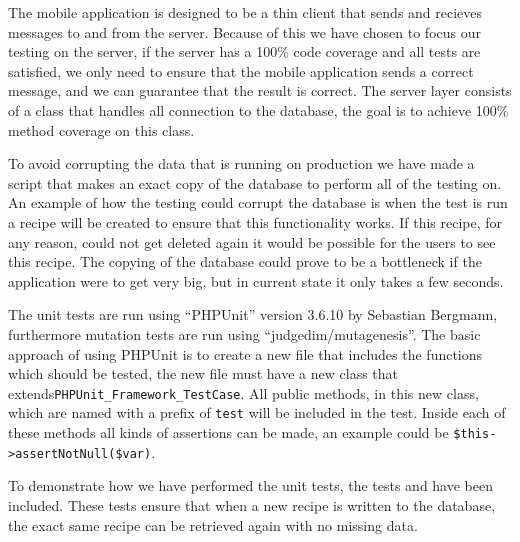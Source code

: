 The mobile application is designed to be a thin client that sends and recieves messages to and from the server. Because of this we have chosen to focus our testing on the server, if the server has a 100\% code coverage and all tests are satisfied, we only need to ensure that the mobile application sends a correct message, and we can guarantee that the result is correct.
The server layer consists of a class that handles all connection to the database, the goal is to achieve 100\% method coverage on this class.

To avoid corrupting the data that is running on production we have made a script that makes an exact copy of the database to perform all of the testing on. An example of how the testing could corrupt the database is when the test is run a recipe will be created to ensure that this functionality works. If this recipe, for any reason, could not get deleted again it would be possible for the users to see this recipe. The copying of the database could prove to be a bottleneck if the application were to get very big, but in current state it only takes a few seconds.

The unit tests are run using ``PHPUnit'' version 3.6.10 by Sebastian Bergmann\cite{phpunit}, furthermore mutation tests are run using ``judgedim/mutagenesis''\cite{mutagenesis}. The basic approach of using PHPUnit is to create a new file that includes the functions which should be tested, the new file must have a new class that extends\linebreak \lstinline|PHPUnit_Framework_TestCase|. All public methods, in this new class, which are named with a prefix of \lstinline|test| will be included in the test. Inside each of these methods all kinds of assertions can be made, an example could be \lstinline|$this->assertNotNull($var)|.

To demonstrate how we have performed the unit tests, the tests  and  have been included. These tests ensure that when a new recipe is written to the database, the exact same recipe can be retrieved again with no missing data.

